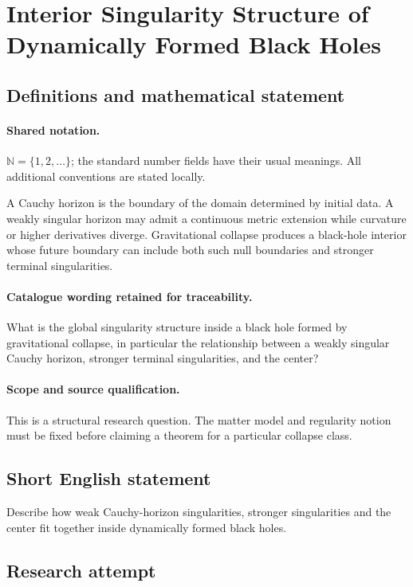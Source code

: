 \documentclass[11pt]{article}
\begin{document}
\section{Interior Singularity Structure of Dynamically Formed Black Holes}\label{statement}

\subsection{Definitions and mathematical statement}

\paragraph{Shared notation.}$\mathbb N=\{1,2,\ldots\}$; the standard number fields have their usual meanings. All additional conventions are stated locally.


A Cauchy horizon is the boundary of the domain determined by initial data. A weakly singular horizon may admit a continuous metric extension while curvature or higher derivatives diverge. Gravitational collapse produces a black-hole interior whose future boundary can include both such null boundaries and stronger terminal singularities.

\paragraph{Catalogue wording retained for traceability.}
What is the global singularity structure inside a black hole formed by gravitational collapse, in particular the relationship between a weakly singular Cauchy horizon, stronger terminal singularities, and the center?

\paragraph{Scope and source qualification.}This is a structural research question. The matter model and regularity notion must be fixed before claiming a theorem for a particular collapse class.
\subsection{Short English statement}
Describe how weak Cauchy-horizon singularities, stronger singularities and the center fit together inside dynamically formed black holes.
\subsection{Research attempt}
\end{document}

